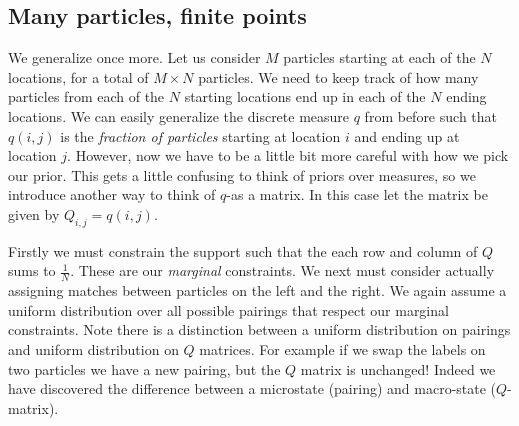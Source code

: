 \documentclass{article}
\begin{document}
\subsection{Many particles, finite points}
\label{sec:many_particles}
We generalize once more. Let us consider $M$ particles starting at each of
the $N$ locations, for a total of $M \times N$ particles. We need to keep
track of how many particles from each of the $N$ starting locations end up in 
each of the $N$ ending locations. We can easily generalize the discrete measure
$q$ from before such that $q(i,j)$ is the \emph{fraction of particles} starting
at location $i$ and ending up at location $j$. However, now we have to be a
little bit more careful with how we pick our prior. This gets a little confusing
to think of priors over measures, so we introduce another way to think of 
$q$-as a matrix. In this case let the matrix be given by $Q_{i,j} = q(i,j)$.

Firstly we must constrain the support such that the each row and column of 
$Q$ sums to $\frac 1 N$. These are our \emph{marginal} constraints. We next must
consider actually assigning matches between particles on the left and the right.
We again assume a uniform distribution over all possible pairings that respect
our marginal constraints. Note there is a distinction between a uniform 
distribution on pairings and uniform distribution on $Q$
matrices. For example if we swap the labels on two particles we have a new
pairing, but the $Q$ matrix is unchanged! Indeed we have discovered the
difference between a microstate (pairing) and macro-state ($Q$-matrix).
\end{document}
